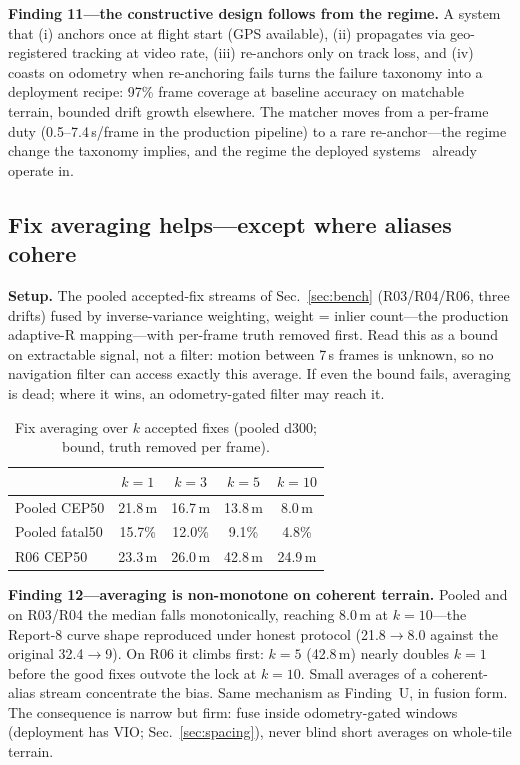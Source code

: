 \documentclass[journal]{IEEEtran}
\begin{document}
\textbf{Finding 11---the constructive design follows from the regime.} A system that (i) anchors once at flight start (GPS available), (ii) propagates via geo-registered tracking at video rate, (iii) re-anchors only on track loss, and (iv) coasts on odometry when re-anchoring fails turns the failure taxonomy into a deployment recipe: 97\% frame coverage at baseline accuracy on matchable terrain, bounded drift growth elsewhere. The matcher moves from a per-frame duty (0.5--7.4\,s/frame in the production pipeline) to a rare re-anchor---the regime change the taxonomy implies, and the regime the deployed systems~\cite{orthotrack,naviloc,cpfl} already operate in.

\subsection{Fix averaging helps---except where aliases cohere}
\label{sec:averaging}

\textbf{Setup.} The pooled accepted-fix streams of Sec.~\ref{sec:bench} (R03/R04/R06, three drifts) fused by inverse-variance weighting, weight = inlier count---the production adaptive-R mapping---with per-frame truth removed first. Read this as a bound on extractable signal, not a filter: motion between 7\,s frames is unknown, so no navigation filter can access exactly this average. If even the bound fails, averaging is dead; where it wins, an odometry-gated filter may reach it.

\begin{table}[t]
\caption{Fix averaging over $k$ accepted fixes (pooled d300; bound, truth removed per frame).}
\label{tab:averaging}
\centering
\footnotesize
\begin{tabular}{@{}lcccc@{}}
\toprule
 & $k{=}1$ & $k{=}3$ & $k{=}5$ & $k{=}10$ \\
\midrule
Pooled CEP50 & 21.8\,m & 16.7\,m & 13.8\,m & 8.0\,m \\
Pooled fatal50 & 15.7\% & 12.0\% & 9.1\% & 4.8\% \\
R06 CEP50 & 23.3\,m & 26.0\,m & 42.8\,m & 24.9\,m \\
\bottomrule
\end{tabular}
\end{table}

\textbf{Finding 12---averaging is non-monotone on coherent terrain.} Pooled and on R03/R04 the median falls monotonically, reaching 8.0\,m at $k{=}10$---the Report-8 curve shape reproduced under honest protocol (21.8$\to$8.0 against the original 32.4$\to$9). On R06 it climbs first: $k{=}5$ (42.8\,m) nearly doubles $k{=}1$ before the good fixes outvote the lock at $k{=}10$. Small averages of a coherent-alias stream concentrate the bias. Same mechanism as Finding~U, in fusion form. The consequence is narrow but firm: fuse inside odometry-gated windows (deployment has VIO; Sec.~\ref{sec:spacing}), never blind short averages on whole-tile terrain.
\end{document}
